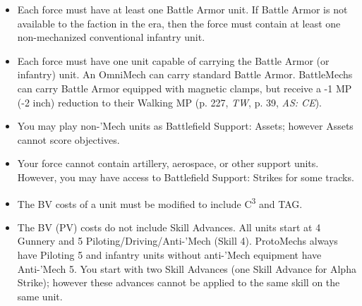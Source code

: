 \begin{itemize}
\item Each force must have at least one Battle Armor unit.
If Battle Armor is not available to the faction in the era, then the force must contain at least one non-mechanized conventional infantry unit.

\item Each force must have one unit capable of carrying the Battle Armor (or infantry) unit.
An OmniMech can carry standard Battle Armor.
BattleMechs can carry Battle Armor equipped with magnetic clamps, but receive a -1 MP (-2 inch) reduction to their Walking MP (p. 227, \emph{TW}, p. 39, \emph{AS: CE}).

\item You may play non-'Mech units as Battlefield Support: Assets; however Assets cannot score objectives.

\item Your force cannot contain artillery, aerospace, or other support units.
However, you may have access to Battlefield Support: Strikes for some tracks.

\item The BV costs of a unit must be modified to include C\textsuperscript{3} and TAG.

\item The BV (PV) costs do not include Skill Advances.
All units start at 4 Gunnery and 5 Piloting/Driving/Anti-'Mech (Skill 4).
ProtoMechs always have Piloting 5 and infantry units without anti-'Mech equipment have Anti-'Mech 5.
You start with two Skill Advances (one Skill Advance for Alpha Strike); however these advances cannot be applied to the same skill on the same unit.

\end{itemize}

